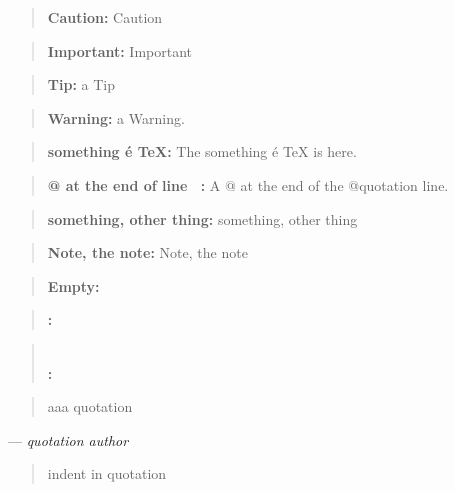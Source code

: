 \documentclass{book}
\begin{document}
\begin{quote}
\textbf{Caution:} Caution
\end{quote}

\begin{quote}
\textbf{Important:} Important
\end{quote}

\begin{quote}
\textbf{Tip:} a Tip
\end{quote}

\begin{quote}
\textbf{Warning:} a Warning.
\end{quote}

\begin{quote}
\textbf{something \'{e} \TeX{}:} The something \'{e} \TeX{} is here.
\end{quote}

\begin{quote}
\textbf{@ at the end of line \ {}:} A @ at the end of the @quotation line.
\end{quote}

\begin{quote}
\textbf{something, other thing:} something, other thing
\end{quote}

\begin{quote}
\textbf{Note, the note:} Note, the note
\end{quote}

\begin{quote}
\end{quote}

\begin{quote}
\textbf{Empty:} \end{quote}

\begin{quote}
\textbf{:} \end{quote}

\begin{quote}
\textbf{\leavevmode{}\\:} \end{quote}

\begin{quote}
aaa quotation
\end{quote}
\begin{center}
--- \emph{quotation author}
\end{center}

\begin{quote}
indent in quotation
\end{quote}
\end{document}
